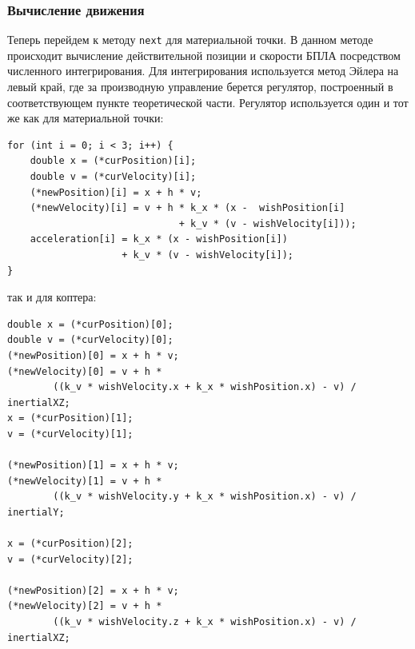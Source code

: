 \documentclass[a4paper,12pt]{article}
\numberwithin{figure}{subsubsection}
\begin{document}
\subsubsection{Вычисление движения}
Теперь перейдем к методу \texttt{next} для материальной точки. В данном методе происходит вычисление действительной позиции и скорости БПЛА посредством численного интегрирования. Для интегрирования используется метод Эйлера на левый край, где за производную управление берется регулятор, построенный в соответствующем пункте теоретической части. Регулятор используется один и тот же как для материальной точки:
\begin{verbatim}
for (int i = 0; i < 3; i++) {
    double x = (*curPosition)[i];
    double v = (*curVelocity)[i];
    (*newPosition)[i] = x + h * v;
    (*newVelocity)[i] = v + h * k_x * (x -  wishPosition[i] 
                              + k_v * (v - wishVelocity[i]));
    acceleration[i] = k_x * (x - wishPosition[i]) 
                    + k_v * (v - wishVelocity[i]);
}
\end{verbatim}
так и для коптера:
\begin{verbatim}
double x = (*curPosition)[0];
double v = (*curVelocity)[0];
(*newPosition)[0] = x + h * v;
(*newVelocity)[0] = v + h * 
        ((k_v * wishVelocity.x + k_x * wishPosition.x) - v) / inertialXZ;
x = (*curPosition)[1];
v = (*curVelocity)[1];

(*newPosition)[1] = x + h * v;
(*newVelocity)[1] = v + h * 
        ((k_v * wishVelocity.y + k_x * wishPosition.x) - v) / inertialY;

x = (*curPosition)[2];
v = (*curVelocity)[2];

(*newPosition)[2] = x + h * v;
(*newVelocity)[2] = v + h * 
        ((k_v * wishVelocity.z + k_x * wishPosition.x) - v) / inertialXZ;
\end{verbatim}
\end{document}
